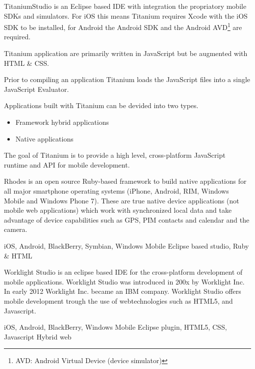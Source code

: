 TitaniumStudio is an Eclipse based IDE with integration the propriatory mobile SDKs and simulators. For iOS this means Titanium requires Xcode with the iOS SDK to be installed, for Android the Android SDK and the Android AVD\footnote{AVD: Android Virtual Device (device simulator)} are required.

Titanium application are primarily written in JavaScript but be augmented with HTML \& CSS. 

Prior to compiling an application Titanium loads the JavaScript files into a single JavaScript Evaluator. 

Applications built with Titanium can be devided into two types.

\begin{itemize}
	\item
	Framework hybrid applications
	\item
	Native applications
\end{itemize}

The goal of Titanium is to provide a high level, cross-platform JavaScript runtime and API for mobile development.\cite{Whinnery2012}

Rhodes is an open source Ruby-based framework to build native applications for all major smartphone operating systems (iPhone, Android, RIM, Windows Mobile and Windows Phone 7). These are true native device applications (not mobile web applications) which work with synchronized local data and take advantage of device capabilities such as GPS, PIM contacts and calendar and the camera. %

iOS, Android, BlackBerry, Symbian, Windows Mobile
Eclipse based studio, Ruby \& HTML


Worklight Studio is an eclipse based IDE for the cross-platform development of mobile applications. Worklight Studio was introduced in 200x by Worklight Inc. In early 2012 Worklight Inc. became an IBM company. Worklight Studio offers mobile development trough the use of webtechnologies such as HTML5, and Javascript.

iOS, Android, BlackBerry, Windows Mobile	
Eclipse plugin, HTML5, CSS, Javascript
Hybrid web

